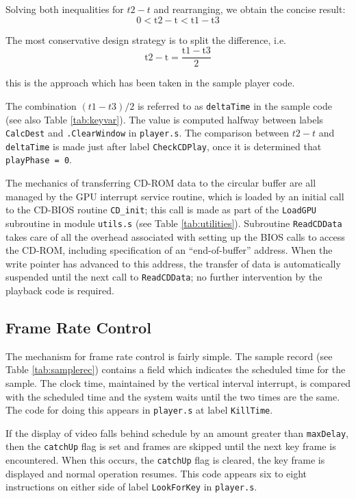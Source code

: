 \documentclass[12pt,letterpaper,twoside]{article}
\begin{document}
Solving both inequalities for $t2 - t$ and rearranging, we obtain the concise result:
\begin{equation}
0 < \mathrm{t2} - \mathrm{t} < \mathrm{t1} - \mathrm{t3}
\end{equation}

The most conservative design strategy is to split the difference, i.e.
\begin{equation}
\mathrm{t2} - \mathrm{t} = \frac{\mathrm{t1} - \mathrm{t3}}{2}
\end{equation}

this is the approach which has been taken in the sample player code.

The combination $(t1 - t3)/2$ is referred to as \texttt{deltaTime} in the sample code (see also Table \ref{tab:keyvar}). The value is computed halfway between labels \texttt{CalcDest} and \texttt{.ClearWindow} in \texttt{player.s}. The comparison between $t2 - t$ and \texttt{deltaTime} is made just after label \texttt{CheckCDPlay}, once it is determined that \texttt{playPhase = 0}.

The mechanics of transferring CD-ROM data to the circular buffer are all managed by the GPU interrupt service routine, which is loaded by an initial call to the CD-BIOS routine \texttt{CD\_init}; this call is made as part of the \texttt{LoadGPU} subroutine in module \texttt{utils.s} (see Table \ref{tab:utilities}). Subroutine \texttt{ReadCDData} takes care of all the overhead associated with setting up the BIOS calls to access the CD-ROM, including specification of an ``end-of-buffer'' address. When the write pointer has advanced to this address, the transfer of data is automatically suspended until the next call to \texttt{ReadCDData}; no further intervention by the playback code is required.

\subsection{Frame Rate Control}
The mechanism for frame rate control is fairly simple. The sample record (see Table \ref{tab:samplerec}) contains a field which indicates the scheduled time for the sample. The clock time, maintained by the vertical interval interrupt, is compared with the scheduled time and the system waits until the two times are the same. The code for doing this appears in \texttt{player.s} at label \texttt{KillTime}.

If the display of video falls behind schedule by an amount greater than \texttt{maxDelay}, then the \texttt{catchUp} flag is set and frames are skipped until the next key frame is encountered. When this occurs, the \texttt{catchUp} flag is cleared, the key frame is displayed and normal operation resumes. This code appears six to eight instructions on either side of label \texttt{LookForKey} in \texttt{player.s}.
\end{document}

